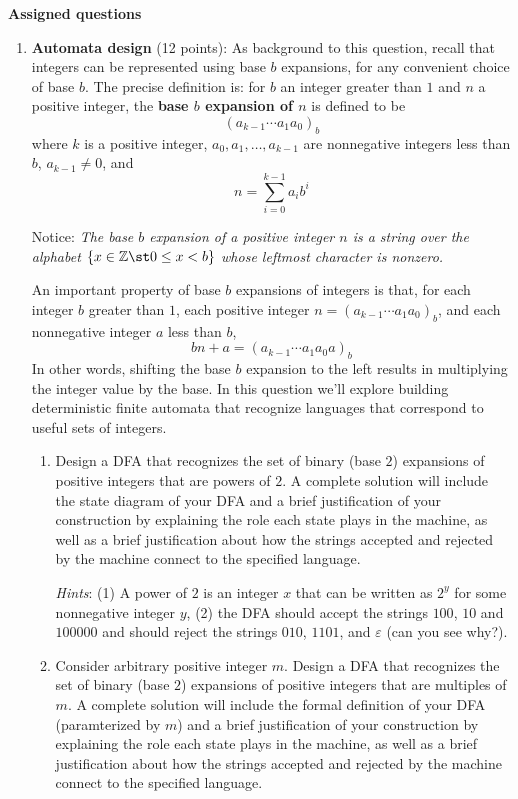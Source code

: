 {\bf Assigned questions}
\begin{enumerate}[wide, labelwidth=!, labelindent=0pt]
\item \textbf{Automata design} (12 points):
As background to this question, recall that integers can be represented using base $b$ expansions, for 
any convenient choice of base $b$. The precise definition is:
for $b$ an integer greater than $1$ and $n$ a positive integer, 
the {\bf base $b$ expansion of $n$}  is defined to be
\[
(a_{k-1} \cdots a_1 a_0)_b
\]
where $k$ is a positive integer, $a_0, a_1, \ldots, a_{k-1}$ 
are nonnegative integers less than $b$, $a_{k-1} \neq  0$, and
\[
n =  \sum_{i=0}^{k-1} a_{i} b^{i}
\]

Notice: {\it The base $b$ expansion of a positive integer $n$ is a string over the alphabet 
$\{x \in \mathbb{Z} \st 0 \leq x < b\}$
whose leftmost character is nonzero.}

An important property of base $b$ expansions of integers is that, for each integer $b$ greater than $1$,
each positive integer $n = (a_{k-1} \cdots a_1 a_0)_b$, and each nonnegative integer $a$ less than $b$, 
\[
    bn + a = (a_{k-1} \cdots a_1 a_0a)_b
\]
In other words, shifting the base $b$ expansion to the left results in multiplying the integer value by the base.
In this question we'll explore building deterministic finite automata that recognize 
languages that correspond to useful sets of integers.

    \begin{enumerate}
    \item\gradeCompleteFirst Design a DFA that recognizes the set of binary (base $2$) expansions of 
    positive integers that are powers of $2$. A complete solution will include the state diagram of your DFA and 
    a brief justification 
    of your construction by explaining the role each state plays in the machine, as well as a brief 
    justification about how the strings accepted and rejected by the machine connect to the specified language.

    {\it Hints}: (1) A power of $2$ is an integer $x$ that can be written as $2^y$ for some nonnegative integer $y$, 
    (2) the DFA should accept the strings $100$, $10$ and $100000$ and should reject the 
    strings $010$, $1101$, and $\varepsilon$ (can you see why?).

    \item\gradeComplete Consider arbitrary positive integer $m$. Design a DFA that recognizes the 
    set of binary (base $2$) expansions of positive integers that are multiples of $m$. A complete solution will
    include the formal definition of your DFA (paramterized by $m$) and a brief justification of your 
    construction by explaining the role each state plays in the machine, as well as a brief 
    justification about how the strings accepted and rejected by the machine connect to the specified language.


\end{enumerate}
\end{enumerate}
